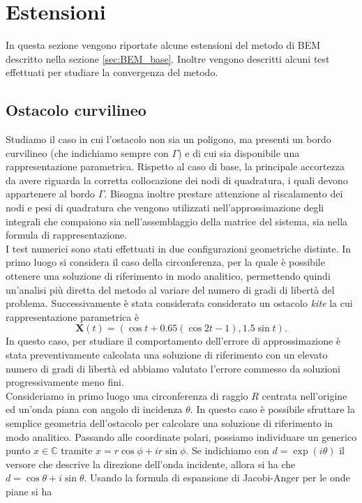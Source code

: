 \documentclass[a4paper,12pt]{article}
\theoremstyle{definition}
\begin{document}
\newpage 
\section{Estensioni}
\label{sec:estensioni}
In questa sezione vengono riportate alcune estensioni del metodo di BEM descritto nella sezione \ref{sec:BEM_base}. Inoltre vengono descritti alcuni test effettuati per studiare la convergenza del metodo.
\subsection{Ostacolo curvilineo}
\label{subsec:ostacolo curvilineo}
Studiamo il caso in cui l'ostacolo non sia un poligono, ma presenti un bordo curvilineo (che indichiamo sempre con $\Gamma$) e di cui sia disponibile una rappresentazione parametrica. Rispetto al caso di base, la principale accortezza da avere riguarda la corretta collocazione dei nodi di quadratura, i quali devono appartenere al bordo $\Gamma$. Bisogna inoltre prestare attenzione al riscalamento dei nodi e pesi di quadratura che vengono utilizzati nell'approssimazione degli integrali che compaiono sia nell'assemblaggio della matrice del sistema, sia nella formula di rappresentazione. \\
I test numerici sono stati effettuati in due configurazioni geometriche distinte. In primo luogo si considera il caso della circonferenza, per la quale è possibile ottenere una soluzione di riferimento in modo analitico, permettendo quindi un'analisi più diretta del metodo al variare del numero di gradi di libertà del problema. Successivamente è stata considerata considerato un ostacolo \textit{kite} la cui rappresentazione parametrica è
\begin{equation}
\label{eq:parametrizzazione kite}
    \textbf{X}(t) = (\cos t + 0.65 (\cos 2t - 1), 1.5\sin t). 
\end{equation}
In questo caso, per studiare il comportamento dell'errore di approssimazione è stata preventivamente calcolata una soluzione di riferimento con un elevato numero di gradi di libertà ed abbiamo valutato l'errore commesso da soluzioni progressivamente meno fini. \\
Consideriamo in primo luogo una circonferenza di raggio $R$ centrata nell'origine ed un'onda piana con angolo di incidenza $\theta$. In questo caso è possibile sfruttare la semplice geometria dell'ostacolo per calcolare una soluzione di riferimento in modo analitico. Passando alle coordinate polari, possiamo individuare un generico punto $x \in \mathbb{C}$ tramite $x=r\cos \phi +ir\sin \phi$. Se indichiamo con $d=\exp(i\theta)$ il versore che descrive la direzione dell'onda incidente, allora si ha che $d = \cos \theta +i\sin\theta$. Usando la formula di espansione di Jacobi-Anger per le onde piane si ha
\end{document}
